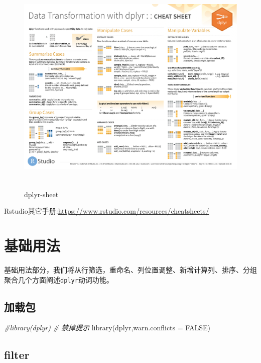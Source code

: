 \documentclass[
]{book}
\newenvironment{Shaded}{\begin{snugshade}}{\end{snugshade}}
\newcommand{\AttributeTok}[1]{\textcolor[rgb]{0.77,0.63,0.00}{#1}}
\newcommand{\CommentTok}[1]{\textcolor[rgb]{0.56,0.35,0.01}{\textit{#1}}}
\newcommand{\ConstantTok}[1]{\textcolor[rgb]{0.00,0.00,0.00}{#1}}
\newcommand{\FunctionTok}[1]{\textcolor[rgb]{0.00,0.00,0.00}{#1}}
\newcommand{\NormalTok}[1]{#1}
\begin{document}
\begin{figure}
\centering
\includegraphics[width=1\textwidth,height=4.16667in]{./picture/dplyr/data-transformation.pdf}
\caption{dplyr-sheet}
\end{figure}

Rstudio其它手册:\url{https://www.rstudio.com/resources/cheatsheets/}

\hypertarget{ux57faux7840ux7528ux6cd5}{%
\section{基础用法}\label{ux57faux7840ux7528ux6cd5}}

基础用法部分，我们将从行筛选，重命名、列位置调整、新增计算列、排序、分组聚合几个方面阐述\texttt{dplyr}动词功能。

\hypertarget{ux52a0ux8f7dux5305}{%
\subsection{加载包}\label{ux52a0ux8f7dux5305}}

\begin{Shaded}
\begin{Highlighting}[]
\CommentTok{\#library(dplyr)}
\CommentTok{\# 禁掉提示}
\FunctionTok{library}\NormalTok{(dplyr,}\AttributeTok{warn.conflicts =} \ConstantTok{FALSE}\NormalTok{)}
\end{Highlighting}
\end{Shaded}

\hypertarget{filter}{%
\subsection{filter}\label{filter}}
\end{document}
